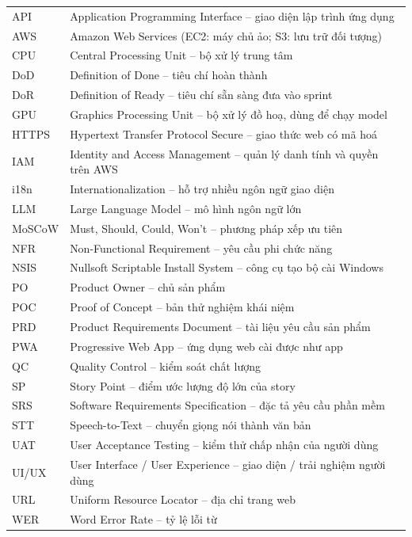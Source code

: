 \documentclass[12pt,a4paper]{report}
\begin{document}
\begin{center}
  \begin{tabular}{@{}P{2.2cm}P{13.2cm}@{}}
    \toprule
     &  \\
    \midrule
    API    & Application Programming Interface -- giao diện lập trình ứng dụng \\
    AWS    & Amazon Web Services (EC2: máy chủ ảo; S3: lưu trữ đối tượng) \\
    CPU    & Central Processing Unit -- bộ xử lý trung tâm \\
    DoD    & Definition of Done -- tiêu chí hoàn thành \\
    DoR    & Definition of Ready -- tiêu chí sẵn sàng đưa vào sprint \\
    GPU    & Graphics Processing Unit -- bộ xử lý đồ hoạ, dùng để chạy model \\
    HTTPS  & Hypertext Transfer Protocol Secure -- giao thức web có mã hoá \\
    IAM    & Identity and Access Management -- quản lý danh tính và quyền trên AWS \\
    i18n   & Internationalization -- hỗ trợ nhiều ngôn ngữ giao diện \\
    LLM    & Large Language Model -- mô hình ngôn ngữ lớn \\
    MoSCoW & Must, Should, Could, Won't -- phương pháp xếp ưu tiên \\
    NFR    & Non-Functional Requirement -- yêu cầu phi chức năng \\
    NSIS   & Nullsoft Scriptable Install System -- công cụ tạo bộ cài Windows \\
    PO     & Product Owner -- chủ sản phẩm \\
    POC    & Proof of Concept -- bản thử nghiệm khái niệm \\
    PRD    & Product Requirements Document -- tài liệu yêu cầu sản phẩm \\
    PWA    & Progressive Web App -- ứng dụng web cài được như app \\
    QC     & Quality Control -- kiểm soát chất lượng \\
    SP     & Story Point -- điểm ước lượng độ lớn của story \\
    SRS    & Software Requirements Specification -- đặc tả yêu cầu phần mềm \\
    STT    & Speech-to-Text -- chuyển giọng nói thành văn bản \\
    UAT    & User Acceptance Testing -- kiểm thử chấp nhận của người dùng \\
    UI/UX  & User Interface / User Experience -- giao diện / trải nghiệm người dùng \\
    URL    & Uniform Resource Locator -- địa chỉ trang web \\
    WER    & Word Error Rate -- tỷ lệ lỗi từ \\
    \bottomrule
  \end{tabular}
\end{center}
\end{document}
